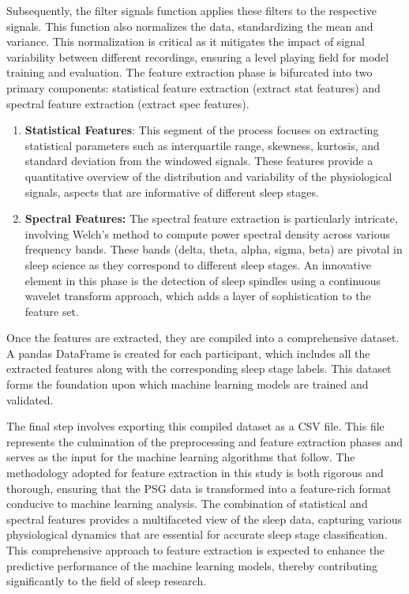\documentclass[12pt, a4paper,oneside]{book}
\numberwithin{equation}{section}
\begin{document}
Subsequently, the filter signals function applies these filters to the respective signals. This function also normalizes the data, standardizing the mean and variance. This normalization is critical as it mitigates the impact of signal variability between different recordings, ensuring a level playing field for model training and evaluation.
The feature extraction phase is bifurcated into two primary components: statistical feature extraction (extract stat features) and spectral feature extraction (extract spec features).
\begin{enumerate}
    \item \textbf{Statistical Features}: This segment of the process focuses on extracting statistical parameters such as interquartile range, skewness, kurtosis, and standard deviation from the windowed signals. These features provide a quantitative overview of the distribution and variability of the physiological signals, aspects that are informative of different sleep stages.
    \item \textbf{Spectral Features:} The spectral feature extraction is particularly intricate, involving Welch's method to compute power spectral density across various frequency bands. These bands (delta, theta, alpha, sigma, beta) are pivotal in sleep science as they correspond to different sleep stages. An innovative element in this phase is the detection of sleep spindles using a continuous wavelet transform approach, which adds a layer of sophistication to the feature set.
\end{enumerate}
Once the features are extracted, they are compiled into a comprehensive dataset. A pandas DataFrame is created for each participant, which includes all the extracted features along with the corresponding sleep stage labels. This dataset forms the foundation upon which machine learning models are trained and validated.

The final step involves exporting this compiled dataset as a CSV file. This file represents the culmination of the preprocessing and feature extraction phases and serves as the input for the machine learning algorithms that follow.
The methodology adopted for feature extraction in this study is both rigorous and thorough, ensuring that the PSG data is transformed into a feature-rich format conducive to machine learning analysis. The combination of statistical and spectral features provides a multifaceted view of the sleep data, capturing various physiological dynamics that are essential for accurate sleep stage classification. This comprehensive approach to feature extraction is expected to enhance the predictive performance of the machine learning models, thereby contributing significantly to the field of sleep research.
\end{document}
